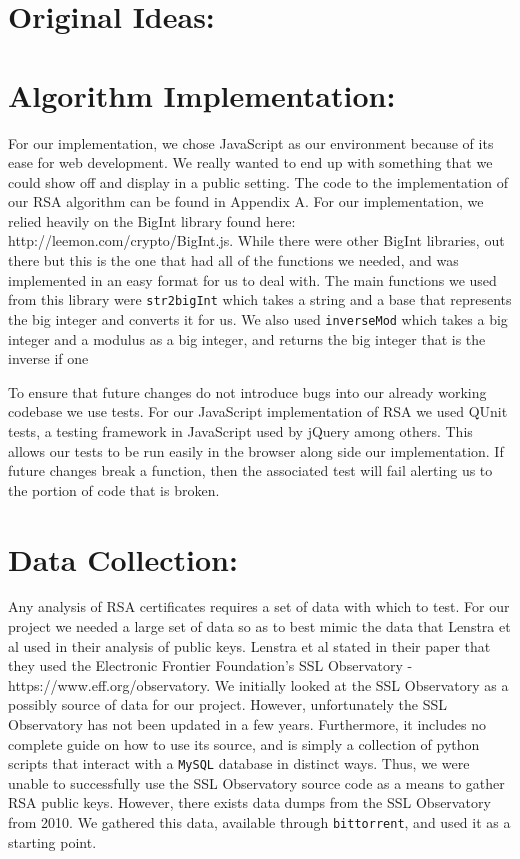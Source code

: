 \documentclass[12pt]{article}
\newcommand{\ty}[1]{\texttt{#1}}
\begin{document}
\section{Original Ideas:}

\section{Algorithm Implementation:}
For our implementation, we chose JavaScript as our environment because of its
ease for web development. We really wanted to end up with something that we
could show off and display in a public setting. The code to the implementation
of our RSA algorithm can be found in Appendix A. For our implementation, we
relied heavily on the BigInt library found here: 
http://leemon.com/crypto/BigInt.js.
While there were other BigInt libraries, out there but this is the one that had
all of the functions we needed, and was implemented in an easy format for us to
deal with. The main functions we used from this library were \ty{str2bigInt}
which takes a string and a base that represents the big integer and converts it
for us. We also used \ty{inverseMod} which takes a big integer and a modulus as
a big integer, and returns the big integer that is the inverse if one 



To ensure that future changes do not introduce bugs into our already working codebase we use tests. For our JavaScript implementation of RSA we used QUnit tests, a testing framework in JavaScript used by jQuery among others. This allows our tests to be run easily in the browser along side our implementation. If future changes break a function, then the associated test will fail alerting us to the portion of code that is broken.




\section{Data Collection:}
Any analysis of RSA certificates requires a set of data with which to test. For
our project we needed a large set of data so as to best mimic the data that
Lenstra et al used in their analysis of public keys. Lenstra et al stated in their paper
that they used the Electronic Frontier Foundation's SSL Observatory -
https://www.eff.org/observatory. We initially looked at the SSL Observatory as a
possibly source of data for our project. However, unfortunately the SSL
Observatory has not been updated in a few years. Furthermore, it includes no
complete guide on how to use its source, and is simply a collection of python
scripts that interact with a \ty{MySQL} database in distinct ways. Thus, we were
unable to successfully use the SSL Observatory source code as a means to gather
RSA public keys. However, there exists data dumps from the SSL Observatory from
2010. We gathered this data, available through \ty{bittorrent}, and used it as a
starting point.
\end{document}
